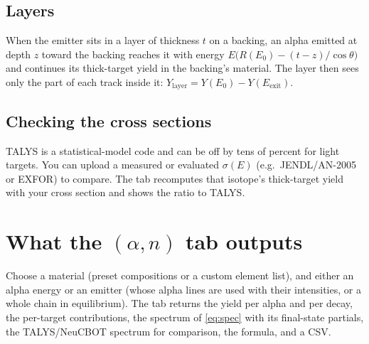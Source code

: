 \subsection{Layers}
When the emitter sits in a layer of thickness $t$ on a backing, an alpha emitted at depth $z$ toward the backing reaches it with energy $E\big(R(E_0) - (t-z)/\cos\theta\big)$ and continues its thick-target yield in the backing's material. The layer then sees only the part of each track inside it: $Y_\text{layer} = Y(E_0) - Y(E_\text{exit})$.

\subsection{Checking the cross sections}
TALYS is a statistical-model code and can be off by tens of percent for light targets. You can upload a measured or evaluated $\sigma(E)$ (e.g.\ JENDL/AN-2005 or EXFOR) to compare. The tab recomputes that isotope's thick-target yield with your cross section and shows the ratio to TALYS.
\section{What the $(\alpha,n)$ tab outputs}
Choose a material (preset compositions or a custom element list), and either an alpha energy or an emitter (whose alpha lines are used with their intensities, or a whole chain in equilibrium). The tab returns the yield per alpha and per decay, the per-target contributions, the spectrum of \cref{eq:spec} with its final-state partials, the TALYS/NeuCBOT spectrum for comparison, the formula, and a CSV.

